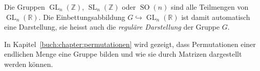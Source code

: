 \begin{beispiel}
Die Gruppen $\operatorname{GL}_n(\mathbb{Z})$,
$\operatorname{SL}_n(\mathbb{Z})$ oder $\operatorname{SO}(n)$ 
sind alle Teilmengen von $\operatorname{GL}_n(\mathbb{R})$.
Die Einbettungsabbildung $G\hookrightarrow \operatorname{GL}_n(\mathbb{R})$
ist damit automatisch eine Darstellung, sie heisst auch die
{\em reguläre Darstellung} der Gruppe $G$.
%
%
\end{beispiel}

In Kapitel~\ref{buch:chapter:permutationen} wird gezeigt, 
dass Permutationen einer endlichen Menge eine Gruppe bilden und wie
sie durch Matrizen dargestellt werden können.






